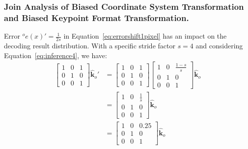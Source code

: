 \documentclass[10pt,journal,compsoc]{IEEEtran}
\begin{document}
\subsubsection{Join Analysis of Biased Coordinate System Transformation and Biased Keypoint Format Transformation.}

Error ${^o}e(x)' = \frac{1}{2s}$ in Equation~\ref{eq:errorshift1pixel} has an impact on the decoding result distribution. With a specific stride factor $s=4$ and considering Equation~\ref{eq:inference4}, we have:
\begin{equation}
    \begin{split}
    \begin{bmatrix} 1 & 0 & 1 \\
                    0 & 1 & 0 \\
                    0 & 0 & 1 \end{bmatrix}\hat{\textbf{k}}_o' &= \begin{bmatrix} 1 & 0 & 1 \\
                                                                                  0 & 1 & 0 \\
                                                                                  0 & 0 & 1 \end{bmatrix}\begin{bmatrix} 1 & 0 & \frac{1-s}{s} \\
                                                                                                                         0 & 1 & 0 \\
                                                                                                                         0 & 0 & 1 \end{bmatrix}\hat{\textbf{k}}_o\\
                    &=\begin{bmatrix} 1 & 0 & \frac{1}{s} \\
                                      0 & 1 & 0 \\
                                      0 & 0 &1 \end{bmatrix}\hat{\textbf{k}}_o\\
                    &=\begin{bmatrix} 1 & 0 & 0.25 \\
                                      0 & 1 & 0 \\
                                      0 & 0 & 1 \end{bmatrix}\hat{\textbf{k}}_o
    \end{split}
\end{equation}
\end{document}
